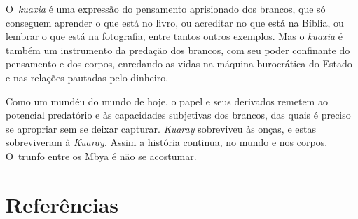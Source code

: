 O~\emph{kuaxia} é uma expressão do pensamento aprisionado dos brancos, que só
conseguem aprender o que está no livro, ou acreditar no que está na
Bíblia, ou lembrar o que está na fotografia, entre tantos outros
exemplos. Mas o \emph{kuaxia} é também um instrumento da predação dos brancos,
com seu poder confinante do pensamento e dos corpos, enredando as vidas
na máquina burocrática do Estado e nas relações pautadas pelo dinheiro.


Como um mundéu do mundo de hoje, o papel e seus derivados remetem ao
potencial predatório e às capacidades subjetivas dos brancos, das quais
é preciso se apropriar sem se deixar capturar. \emph{Kuaray} sobreviveu às
onças, e estas sobreviveram à \emph{Kuaray}. Assim a história continua, no
mundo e nos corpos. O~trunfo entre os Mbya é não se acostumar.

\section{Referências} 

